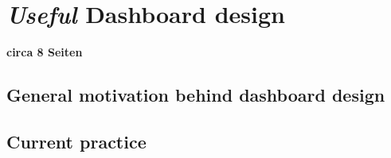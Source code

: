 \chapter{\textit{Useful} Dashboard design}
\textbf{circa 8 Seiten}

\section{General motivation behind dashboard design} \label{sec:DashboardGeneral}

\section{Current practice} \label{sec:Dashboard_CurrentPractice}


